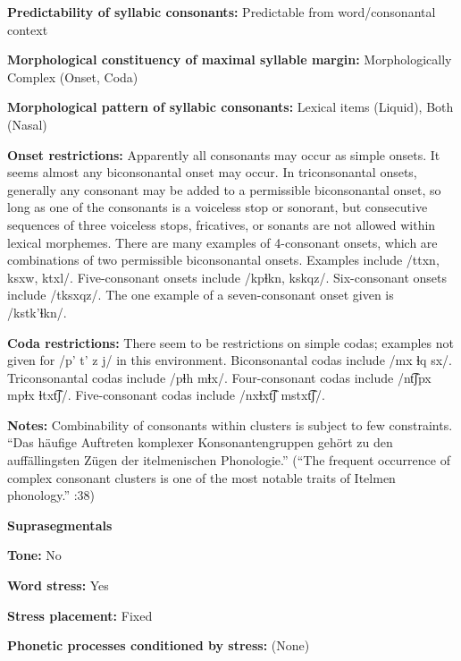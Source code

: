 \textbf{Predictability of syllabic consonants:} Predictable from word/consonantal context



\textbf{Morphological constituency of maximal syllable margin:} Morphologically Complex (Onset, Coda)



\textbf{Morphological pattern of syllabic consonants:} Lexical items (Liquid), Both (Nasal)



\textbf{Onset restrictions:} Apparently all consonants may occur as simple onsets. It seems almost any biconsonantal onset may occur. In triconsonantal onsets, generally any consonant may be added to a permissible biconsonantal onset, so long as one of the consonants is a voiceless stop or sonorant, but consecutive sequences of three voiceless stops, fricatives, or sonants are not allowed within lexical morphemes. There are many examples of 4-consonant onsets, which are combinations of two permissible biconsonantal onsets. Examples include /ttxn, ksxw, ktxl/. Five-consonant onsets include /kpɬkn, kskqz/. Six-consonant onsets include /tksxqz/. The one example of a seven-consonant onset given is /kstk’ɬkn/.



\textbf{Coda restrictions:} There seem to be restrictions on simple codas; examples not given for /p’ t’ z j/ in this environment. Biconsonantal codas include /mx ɬq sx/. Triconsonantal codas include /pɬh mɬx/. Four-consonant codas include /nt͡ʃpx mpɬx ɬtxt͡ʃ/. Five-consonant codas include /nxɬxt͡ʃ mstxt͡ʃ/.



\textbf{Notes:} Combinability of consonants within clusters is subject to few constraints. “Das häufige Auftreten komplexer Konsonantengruppen gehört zu den auffällingsten Zügen der itelmenischen Phonologie.” (“The frequent occurrence of complex consonant clusters is one of the most notable traits of Itelmen phonology.” \citealt{GeorgVolodin1999}:38)



\textbf{Suprasegmentals}



\textbf{Tone:} No



\textbf{Word stress:} Yes



\textbf{Stress placement:} Fixed



\textbf{Phonetic processes conditioned by stress:} (None)



